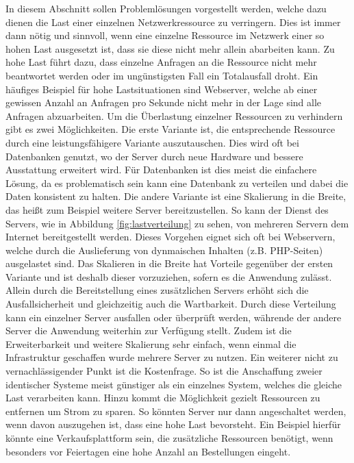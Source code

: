 \documentclass[a4paper, 12pt, BCOR10mm, DIV12, toc=bibliography, toc=listof, german]{scrbook}
\begin{document}
		In diesem Abschnitt sollen Problemlösungen vorgestellt werden, welche dazu dienen die Last einer
		einzelnen Netzwerkressource zu verringern. Dies ist immer dann nötig und sinnvoll, wenn eine
		einzelne Ressource im Netzwerk einer so hohen Last ausgesetzt ist, dass sie diese nicht mehr
		allein abarbeiten kann. Zu hohe Last führt dazu, dass einzelne Anfragen an die Ressource nicht
		mehr beantwortet werden oder im ungünstigsten Fall ein Totalausfall droht. Ein häufiges Beispiel
		für hohe Lastsituationen sind Webserver, welche ab einer gewissen Anzahl an Anfragen pro Sekunde
		nicht mehr in der Lage sind alle Anfragen abzuarbeiten. Um die Überlastung einzelner Ressourcen
		zu verhindern gibt es zwei Möglichkeiten. Die erste Variante ist, die entsprechende Ressource
		durch eine leistungsfähigere Variante auszutauschen. Dies wird oft bei Datenbanken genutzt, wo
		der Server durch neue Hardware und bessere Ausstattung erweitert wird.  Für Datenbanken ist dies
		meist die einfachere Lösung, da es problematisch sein kann eine Datenbank zu verteilen und dabei
		die Daten konsistent zu halten. Die andere Variante ist eine Skalierung in die Breite, das heißt
		zum Beispiel weitere Server bereitzustellen. So kann der Dienst des Servers, wie in Abbildung
		\ref{fig:lastverteilung} zu sehen, von mehreren Servern dem Internet bereitgestellt werden.
		Dieses Vorgehen eignet sich oft bei Webservern, welche durch die Auslieferung von dynmaischen
		Inhalten (z.B. PHP-Seiten) ausgelastet sind. Das Skalieren in die Breite hat Vorteile gegenüber
		der ersten Variante und ist deshalb dieser vorzuziehen, sofern es die Anwendung zulässt.  Allein
		durch die Bereitstellung eines zusätzlichen Servers erhöht sich die Ausfallsicherheit und
		gleichzeitig auch die Wartbarkeit.  Durch diese Verteilung kann ein einzelner Server ausfallen
		oder überprüft werden, währende der andere Server die Anwendung weiterhin zur Verfügung stellt.
		Zudem ist die Erweiterbarkeit und weitere Skalierung sehr einfach, wenn einmal die Infrastruktur
		geschaffen wurde mehrere Server zu nutzen. Ein weiterer nicht zu vernachlässigender Punkt ist
		die Kostenfrage. So ist die Anschaffung zweier identischer Systeme meist günstiger als ein
		einzelnes System, welches die gleiche Last verarbeiten kann.  Hinzu kommt die Möglichkeit
		gezielt Ressourcen zu entfernen um Strom zu sparen. So könnten Server nur dann angeschaltet
		werden, wenn davon auszugehen ist, dass eine hohe Last bevorsteht.  Ein Beispiel hierfür könnte
		eine Verkaufsplattform sein, die zusätzliche Ressourcen benötigt, wenn	besonders vor Feiertagen
		eine hohe Anzahl an Bestellungen eingeht.
\end{document}
